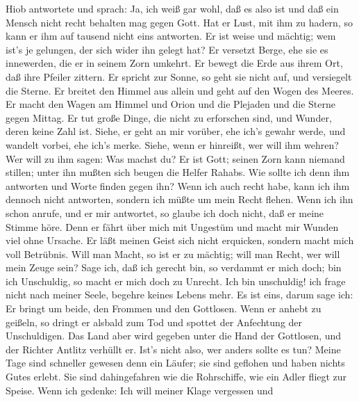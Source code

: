  Hiob antwortete und sprach:  Ja, ich weiß gar
wohl, daß es also ist und daß ein Mensch nicht recht behalten mag gegen
Gott.  Hat er Lust, mit ihm zu hadern, so kann er ihm auf
tausend nicht eins antworten.  Er ist weise und mächtig; wem
ist's je gelungen, der sich wider ihn gelegt hat?  Er
versetzt Berge, ehe sie es innewerden, die er in seinem Zorn umkehrt.
 Er bewegt die Erde aus ihrem Ort, daß ihre Pfeiler zittern.
 Er spricht zur Sonne, so geht sie nicht auf, und versiegelt
die Sterne.  Er breitet den Himmel aus allein und geht auf
den Wogen des Meeres.  Er macht den Wagen am Himmel und
Orion und die Plejaden und die Sterne gegen Mittag.  Er tut
große Dinge, die nicht zu erforschen sind, und Wunder, deren keine Zahl
ist.  Siehe, er geht an mir vorüber, ehe ich's gewahr
werde, und wandelt vorbei, ehe ich's merke.  Siehe, wenn er
hinreißt, wer will ihm wehren? Wer will zu ihm sagen: Was machst du?
 Er ist Gott; seinen Zorn kann niemand stillen; unter ihn
mußten sich beugen die Helfer Rahabs.  Wie sollte ich denn
ihm antworten und Worte finden gegen ihn?  Wenn ich auch
recht habe, kann ich ihm dennoch nicht antworten, sondern ich müßte um
mein Recht flehen.  Wenn ich ihn schon anrufe, und er mir
antwortet, so glaube ich doch nicht, daß er meine Stimme höre.
 Denn er fährt über mich mit Ungestüm und macht mir Wunden
viel ohne Ursache.  Er läßt meinen Geist sich nicht
erquicken, sondern macht mich voll Betrübnis.  Will man
Macht, so ist er zu mächtig; will man Recht, wer will mein Zeuge sein?
 Sage ich, daß ich gerecht bin, so verdammt er mich doch;
bin ich Unschuldig, so macht er mich doch zu Unrecht.  Ich
bin unschuldig! ich frage nicht nach meiner Seele, begehre keines Lebens
mehr.  Es ist eins, darum sage ich: Er bringt um beide, den
Frommen und den Gottlosen.  Wenn er anhebt zu geißeln, so
dringt er alsbald zum Tod und spottet der Anfechtung der Unschuldigen.
 Das Land aber wird gegeben unter die Hand der Gottlosen,
und der Richter Antlitz verhüllt er. Ist's nicht also, wer anders sollte
es tun?  Meine Tage sind schneller gewesen denn ein Läufer;
sie sind geflohen und haben nichts Gutes erlebt.  Sie sind
dahingefahren wie die Rohrschiffe, wie ein Adler fliegt zur Speise.
 Wenn ich gedenke: Ich will meiner Klage vergessen und
